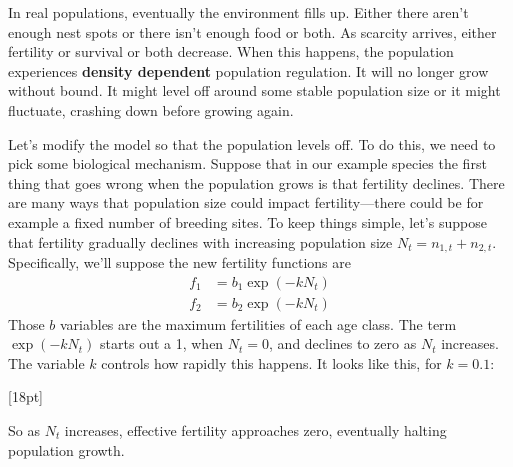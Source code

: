 \documentclass[10pt,reqno]{amsbook}
\newcommand{\bemph}[1]{{\textbf{\textcolor{bemphcol}{#1}}}}
\newcommand{\margincap}[2][10pt]{\marginnote{\small\emph{#2}}[#1]}
\newcounter{myfigure}[chapter]
\newcommand{\figmarlab}[2][18pt]{%
  \refstepcounter{myfigure}%
  \label{#2}%
  \margincap[#1]{Figure\\\thechapter.\themyfigure}%
}
\numberwithin{equation}{chapter}
\begin{document}
In real populations, eventually the environment fills up. Either there aren't enough nest spots or there isn't enough food or both. As scarcity arrives, either fertility or survival or both decrease. When this happens, the population experiences \bemph{density dependent} population regulation. It will no longer grow without bound. It might level off around some stable population size or it might fluctuate, crashing down before growing again.

Let's modify the model so that the population levels off. To do this, we need to pick some biological mechanism. 
Suppose that in our example species the first thing that goes wrong when the population grows is that fertility declines. 
There are many ways that population size could impact fertility---there could be for example a fixed number of breeding sites. To keep things simple, let's suppose that fertility gradually declines with increasing population size $N_t = n_{1,t} + n_{2,t}$. Specifically, we'll suppose the new fertility functions are
\begin{align*}
	f_1 &= b_1 \exp(-k N_t) \\
	f_2 &= b_2 \exp(-k N_t)
\end{align*}
Those $b$ variables are the maximum fertilities of each age class. The term $\exp(-k N_t)$ starts out a 1, when $N_t=0$, and declines to zero as $N_t$ increases. The variable $k$ controls how rapidly this happens. It looks like this, for $k=0.1$:

\vspace{-6pt}
\figmarlab{figSe3}
\begin{center}
\end{center}
So as $N_t$ increases, effective fertility approaches zero, eventually halting population growth.
\end{document}
